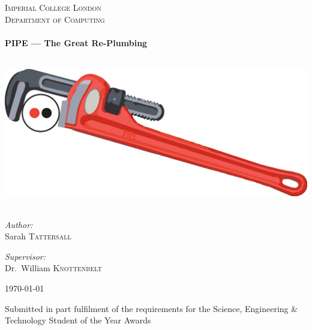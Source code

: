 \begin{titlepage}
\begin{center}



\textsc{\LARGE Imperial College London}\\[1.5cm]

\textsc{\Large Department of Computing}\\[0.5cm]

\HRule \\[0.4cm]
{ \huge \bfseries PIPE --- The Great Re-Plumbing \\[0.4cm] }

\HRule \\[1.5cm]

\includegraphics[scale=0.7]{images/pipe_wrench.png}~\\[1cm]

\begin{minipage}{0.4\textwidth}
\begin{flushleft} \large
\emph{Author:}\\
Sarah \textsc{Tattersall}
\end{flushleft}
\end{minipage}
\begin{minipage}{0.4\textwidth}
\begin{flushright} \large
\emph{Supervisor:} \\
Dr.~William \textsc{Knottenbelt}
\end{flushright}
\end{minipage}

\vfill

{\large \monthyear\today}

Submitted in part fulfilment of the requirements for the Science, Engineering \& Technology Student of the Year Awards


\end{center}
\end{titlepage}